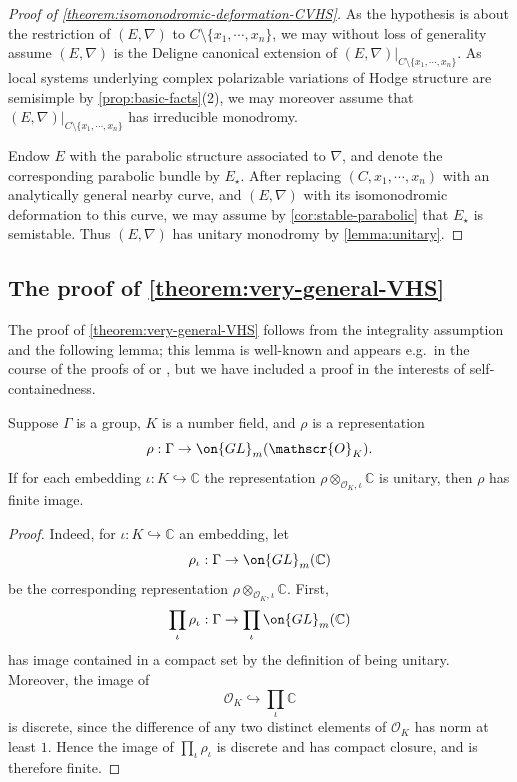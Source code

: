 \begin{proof}[Proof of \autoref{theorem:isomonodromic-deformation-CVHS}]
As the hypothesis is about the restriction of $(E, \nabla)$ to $C\setminus \{x_1, \cdots, x_n\}$, we may without loss of generality assume $(E,\nabla)$ is the Deligne canonical extension of $(E, \nabla)|_{C\setminus \{x_1, \cdots, x_n\}}$. As local systems underlying complex polarizable variations of Hodge structure are semisimple by \autoref{prop:basic-facts}(2), we may moreover assume that $(E, \nabla)|_{C\setminus \{x_1, \cdots, x_n\}}$ has irreducible monodromy.

Endow $E$ with the parabolic structure associated to $\nabla$, and denote the
corresponding parabolic bundle by $E_\star$.
After replacing $(C, x_1, \cdots, x_n)$ with an analytically general nearby
curve, and $(E,\nabla)$ with its isomonodromic deformation to this curve, we may
assume by \autoref{cor:stable-parabolic} that $E_\star$ is semistable.	Thus $(E, \nabla)$ has unitary monodromy by \autoref{lemma:unitary}.
\end{proof}

\subsection{The proof of \autoref{theorem:very-general-VHS}}
\label{subsection:very-general-vhs}
The proof of \autoref{theorem:very-general-VHS} follows
from the integrality assumption and the following lemma; this lemma is well-known and appears e.g.~in the course of the proofs of \cite[Proposition 4.2.1.3]{katz:pcurvature-and-hodge} or \cite[Proposition 8.2]{esnault2020rigid}, but we have included a proof in the interests of self-containedness.

\begin{lemma}
\notready
	\label{lemma:integral-and-unitary-implies-finite}
	Suppose $\Gamma$ is a group,
	$K$ is a number field, and $\rho$ is
	a representation $$\rho: \Gamma\to \on{GL}_m(\mathscr{O}_K).$$
	If for each embedding $\iota: K\hookrightarrow \mathbb{C}$ the
	representation $\rho\otimes_{\mathscr{O}_K, \iota} \mathbb{C}$ is unitary, then
	$\rho$ has finite image.
\end{lemma}
\begin{proof}
Indeed, for $\iota: K\hookrightarrow\mathbb{C}$ an embedding, let $$\rho_\iota:
\Gamma\to \on{GL}_m(\mathbb{C})$$ be the corresponding representation $\rho\otimes_{\mathscr{O}_K, \iota} \mathbb{C}$. First,
$$\prod_\iota \rho_\iota: \Gamma\to \prod_\iota \on{GL}_m(\mathbb{C})$$ has
image contained in a compact set by the definition of being unitary.
Moreover, the image of $$\mathscr{O}_K\hookrightarrow \prod_\iota \mathbb{C}$$
is discrete, since the difference of any two distinct elements of
$\mathscr{O}_K$ has norm at least $1$.
Hence the image of $\prod_\iota \rho_\iota$ is discrete and has compact closure, and is therefore finite.
\end{proof}


